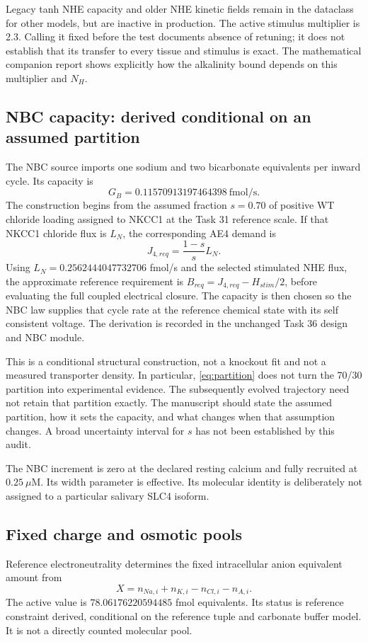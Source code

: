 \documentclass[11pt,a4paper]{article}
\begin{document}
Legacy tanh NHE capacity and older NHE kinetic fields remain in the dataclass for other models, but are inactive in production. The active stimulus multiplier is 2.3. Calling it fixed before the test documents absence of retuning; it does not establish that its transfer to every tissue and stimulus is exact. The mathematical companion report shows explicitly how the alkalinity bound depends on this multiplier and $N_H$.

\subsection{NBC capacity: derived conditional on an assumed partition}
The NBC source imports one sodium and two bicarbonate equivalents per inward cycle. Its capacity is
\[
 G_B=0.11570913197464398\ \mathrm{fmol/s}.
\]
The construction begins from the assumed fraction $s=0.70$ of positive WT chloride loading assigned to NKCC1 at the Task 31 reference scale. If that NKCC1 chloride flux is $L_N$, the corresponding AE4 demand is
\begin{equation}
 J_{4,req}=\frac{1-s}{s}L_N.
 \label{eq:partition}
\end{equation}
Using $L_N=0.2562444047732706$ fmol/s and the selected stimulated NHE flux, the approximate reference requirement is $B_{req}=J_{4,req}-H_{stim}/2$, before evaluating the full coupled electrical closure. The capacity is then chosen so the NBC law supplies that cycle rate at the reference chemical state with its self consistent voltage. The derivation is recorded in the unchanged Task 36 design and NBC module.

This is a conditional structural construction, not a knockout fit and not a measured transporter density. In particular, \cref{eq:partition} does not turn the 70/30 partition into experimental evidence. The subsequently evolved trajectory need not retain that partition exactly. The manuscript should state the assumed partition, how it sets the capacity, and what changes when that assumption changes. A broad uncertainty interval for $s$ has not been established by this audit.

The NBC increment is zero at the declared resting calcium and fully recruited at $0.25\ \mu$M. Its width parameter is effective. Its molecular identity is deliberately not assigned to a particular salivary SLC4 isoform.

\subsection{Fixed charge and osmotic pools}
Reference electroneutrality determines the fixed intracellular anion equivalent amount from
\[
 X=n_{Na,i}+n_{K,i}-n_{Cl,i}-n_{A,i}.
\]
The active value is $78.06176220594485$ fmol equivalents. Its status is reference constraint derived, conditional on the reference tuple and carbonate buffer model. It is not a directly counted molecular pool.
\end{document}
